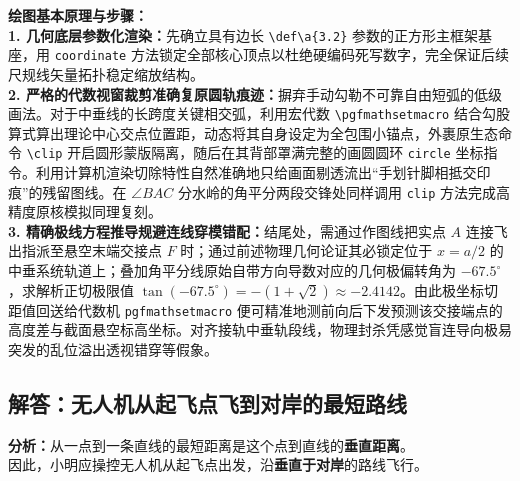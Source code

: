 {\small\color{blue!70!black}
\textbf{绘图基本原理与步骤：}\\
\textbf{1. 几何底层参数化渲染：}先确立具有边长 \texttt{\textbackslash def\textbackslash a\{3.2\}} 参数的正方形主框架基座，用 \texttt{coordinate} 方法锁定全部核心顶点以杜绝硬编码死写数字，完全保证后续尺规线矢量拓扑稳定缩放结构。\\
\textbf{2. 严格的代数视窗裁剪准确复原圆轨痕迹：}摒弃手动勾勒不可靠自由短弧的低级画法。对于中垂线的长跨度关键相交弧，利用宏代数 \texttt{\textbackslash pgfmathsetmacro} 结合勾股算式算出理论中心交点位置距，动态将其自身设定为全包围小锚点，外裹原生态命令 \texttt{\textbackslash clip} 开启圆形蒙版隔离，随后在其背部罩满完整的画圆圆环 \texttt{circle} 坐标指令。利用计算机渲染切除特性自然准确地只给画面剔透流出“手划针脚相抵交印痕”的残留图线。在 $\angle BAC$ 分水岭的角平分两段交锋处同样调用 \texttt{clip} 方法完成高精度原核模拟同理复刻。\\
\textbf{3. 精确极线方程推导规避连线穿模错配：}结尾处，需通过作图线把实点 $A$ 连接飞出指派至悬空末端交接点 $F$ 时；通过前述物理几何论证其必锁定位于 $x=a/2$ 的中垂系统轨道上；叠加角平分线原始自带方向导数对应的几何极偏转角为 $-67.5^\circ$，求解析正切极限值 $\tan(-67.5^\circ) = -(1+\sqrt{2}) \approx -2.4142$。由此极坐标切距值回送给代数机 \texttt{pgfmathsetmacro} 便可精准地测前向后下发预测该交接端点的高度差与截面悬空标高坐标。对齐接轨中垂轨段线，物理封杀凭感觉盲连导向极易突发的乱位溢出透视错穿等假象。
}

\newpage

\newpage

\newpage

\subsection{解答：无人机从起飞点飞到对岸的最短路线}

\vspace{0.6cm}

\noindent
\textbf{分析：}从一点到一条直线的最短距离是这个点到直线的\textbf{垂直距离}。\\[4pt]
因此，小明应操控无人机从起飞点出发，沿\textbf{\textcolor{red!70!black}{垂直于对岸}}的路线飞行。

\vspace{0.8cm}

